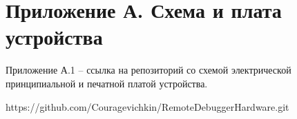 \chapter*{Приложение А. Схема и плата устройства}
\hspace{1cm} 

Приложение А.1 -- ссылка на репозиторий со схемой электрической принципиальной и печатной платой 
устройства.

https://github.com/Couragevichkin/RemoteDebuggerHardware.git